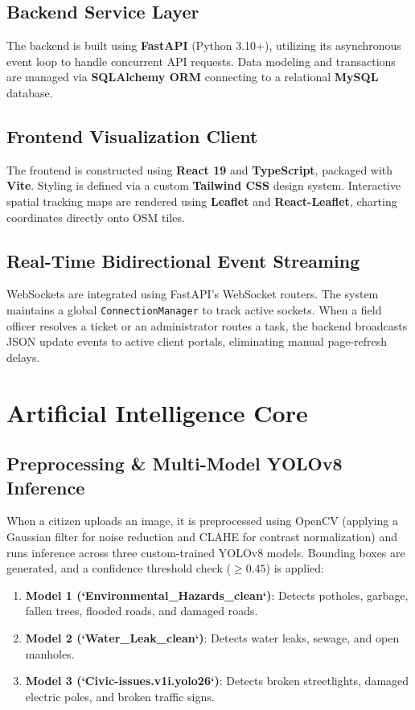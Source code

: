 \documentclass[journal]{IEEEtran}
\begin{document}
\subsection{Backend Service Layer}
The backend is built using \textbf{FastAPI} (Python 3.10+), utilizing its asynchronous event loop to handle concurrent API requests. Data modeling and transactions are managed via \textbf{SQLAlchemy ORM} connecting to a relational \textbf{MySQL} database.

\subsection{Frontend Visualization Client}
The frontend is constructed using \textbf{React 19} and \textbf{TypeScript}, packaged with \textbf{Vite}. Styling is defined via a custom \textbf{Tailwind CSS} design system. Interactive spatial tracking maps are rendered using \textbf{Leaflet} and \textbf{React-Leaflet}, charting coordinates directly onto OSM tiles.

\subsection{Real-Time Bidirectional Event Streaming}
WebSockets are integrated using FastAPI's WebSocket routers. The system maintains a global \texttt{ConnectionManager} to track active sockets. When a field officer resolves a ticket or an administrator routes a task, the backend broadcasts JSON update events to active client portals, eliminating manual page-refresh delays.

\section{Artificial Intelligence Core}

\subsection{Preprocessing & Multi-Model YOLOv8 Inference}
When a citizen uploads an image, it is preprocessed using OpenCV (applying a Gaussian filter for noise reduction and CLAHE for contrast normalization) and runs inference across three custom-trained YOLOv8 models. Bounding boxes are generated, and a confidence threshold check ($\ge 0.45$) is applied:
\begin{enumerate}
    \item \textbf{Model 1 (`Environmental_Hazards_clean`)}: Detects potholes, garbage, fallen trees, flooded roads, and damaged roads.
    \item \textbf{Model 2 (`Water_Leak_clean`)}: Detects water leaks, sewage, and open manholes.
    \item \textbf{Model 3 (`Civic-issues.v1i.yolo26`)}: Detects broken streetlights, damaged electric poles, and broken traffic signs.
\end{enumerate}
\end{document}
